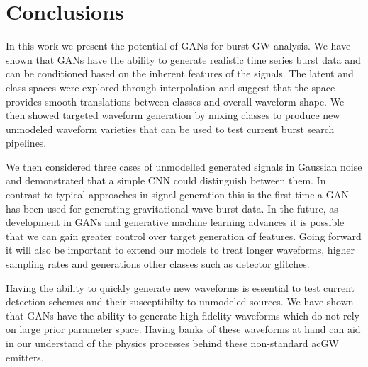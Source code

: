 \documentclass[12pt]{iopart}
\begin{document}
\section{Conclusions}\label{conclusions}

%
In this work we present the potential of \acp{GAN} for
burst \ac{GW} analysis. We have shown that \acp{GAN} have the ability to generate realistic time series burst data and can be conditioned based on the inherent features of the signals. The latent and class spaces were explored through interpolation and
suggest that the space provides smooth translations between classes and overall
waveform shape. We then showed targeted waveform generation by mixing classes
to produce new unmodeled waveform varieties that can be used to test current
burst search pipelines.

We then considered three cases of unmodelled generated signals in Gaussian noise and demonstrated that a simple \ac{CNN} could distinguish between them. 
In contrast to typical approaches in signal generation this is the first time a GAN has been used for generating gravitational wave burst data. In the future, as development in GANs and generative machine learning advances it is possible that we can gain greater control over target generation of features. Going forward it will also be important to extend our models to treat longer waveforms, higher sampling rates and generations other classes such as detector glitches. 

Having the ability to quickly
generate new waveforms is essential to test current detection schemes and their
susceptibilty to unmodeled sources. We have shown that \acp{GAN} have the ability
to generate high fidelity waveforms which do not rely on large prior parameter space. Having banks of these
waveforms at hand can aid in our understand of the physics processes behind
these non-standard ac{GW} emitters.  

\end{document}
